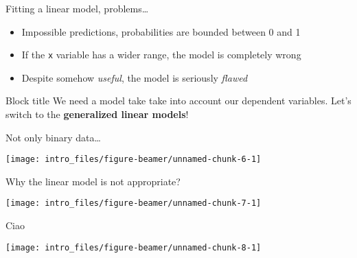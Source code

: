 \documentclass[
  ignorenonframetext,
]{beamer}
\providecommand{\tightlist}{%
  \setlength{\itemsep}{0pt}\setlength{\parskip}{0pt}}
\begin{document}
\begin{frame}[fragile]{Fitting a linear model, problems\ldots{}}
\protect\hypertarget{fitting-a-linear-model-problems-1}{}
\begin{itemize}
\tightlist
\item
  Impossible predictions, probabilities are bounded between 0 and 1
\item
  If the \texttt{x} variable has a wider range, the model is completely
  wrong
\item
  Despite somehow \emph{useful}, the model is seriously \emph{flawed}
\end{itemize}

\begin{block}{Block title}
We need a model take take into account our dependent variables. Let's switch to the \textbf{generalized linear models}! 
\end{block}
\end{frame}

\begin{frame}{Not only binary data\ldots{}}
\protect\hypertarget{not-only-binary-data}{}
\begin{center}\texttt{[image: intro\_files/figure-beamer/unnamed-chunk-6-1]} \end{center}
\end{frame}

\begin{frame}{Why the linear model is not appropriate?}
\protect\hypertarget{why-the-linear-model-is-not-appropriate}{}
\begin{center}\texttt{[image: intro\_files/figure-beamer/unnamed-chunk-7-1]} \end{center}
\end{frame}

\begin{frame}{Ciao}
\protect\hypertarget{ciao}{}
\begin{center}\texttt{[image: intro\_files/figure-beamer/unnamed-chunk-8-1]} \end{center}
\end{frame}
\end{document}
